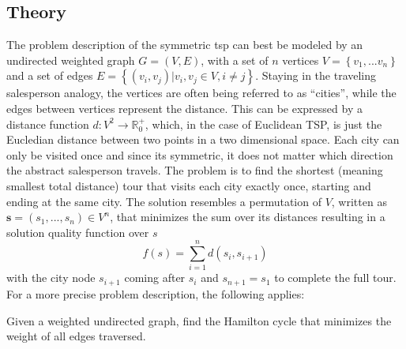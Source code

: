 \subsection{Theory}

The problem description of the symmetric \gls{tsp}  can best be modeled by an undirected weighted graph $G = (V,E)$, with a set of $n$ vertices $V = \left\lbrace v_1, ... v_n\right\rbrace $ and a set of edges $E = \left\lbrace (v_i,v_j) | v_i,v_j \in V, i \neq j\right\rbrace $. Staying in the traveling salesperson analogy, the vertices are often being referred to as \enquote{cities}, while the edges between vertices represent the distance. This can be expressed by a distance function $d : V^2 \rightarrow \mathbb{R}_{0}^{+}$, which, in the case of Euclidean TSP, is just the Eucledian distance between two points in a two dimensional space.  Each city can only be visited once and since its symmetric, it does not matter which direction the abstract salesperson travels. The problem is to find the shortest (meaning smallest total distance) tour that visits each city exactly once, starting and ending at the same city. The solution resembles a permutation of $V$, written as $\textbf{s} = (s_1,...,s_n) \in V^n$, that minimizes the sum over its distances resulting in a solution quality function over $s$
\begin{equation}
	\label{eq:solution_quality}
	f(s) = \sum_{i=1}^{n} d(s_i,s_{i+1}) 
\end{equation}
with the city node $s_{i+1}$ coming after $s_i$ and $s_{n+1} = s_1$ to complete the full tour.
For a more precise problem description, the following applies: 


\begin{list}{}{}
	\item 	Given a weighted undirected graph, find the Hamilton cycle that minimizes the weight of all edges traversed.
\end{list}

